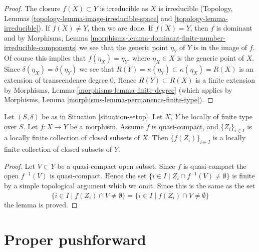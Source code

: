 \begin{proof}
The closure $\overline{f(X)} \subset Y$ is irreducible as $X$
is irreducible (Topology, Lemmas
\ref{topology-lemma-image-irreducible-space} and
\ref{topology-lemma-irreducible}).
If $\overline{f(X)} \not = Y$, then we are done.
If $\overline{f(X)} = Y$, then $f$ is dominant and by
Morphisms,
Lemma \ref{morphisms-lemma-dominant-finite-number-irreducible-components}
we see that the generic point $\eta_Y$ of $Y$ is in the image of $f$.
Of course this implies that $f(\eta_X) = \eta_Y$, where $\eta_X \in X$
is the generic point of $X$. Since $\delta(\eta_X) = \delta(\eta_Y)$
we see that $R(Y) = \kappa(\eta_Y) \subset \kappa(\eta_X) = R(X)$
is an extension of transcendence degree $0$.
Hence $R(Y) \subset R(X)$ is a finite extension by
Morphisms, Lemma \ref{morphisms-lemma-finite-degree}
(which applies by
Morphisms, Lemma \ref{morphisms-lemma-permanence-finite-type}).
\end{proof}

\begin{lemma}
\label{lemma-quasi-compact-locally-finite}
Let $(S, \delta)$ be as in Situation \ref{situation-setup}.
Let $X$, $Y$ be locally of finite type over $S$.
Let $f : X \to Y$ be a morphism.
Assume $f$ is quasi-compact, and $\{Z_i\}_{i \in I}$ is a locally
finite collection of closed subsets of $X$.
Then $\{\overline{f(Z_i)}\}_{i \in I}$ is a locally finite
collection of closed subsets of $Y$.
\end{lemma}

\begin{proof}
Let $V \subset Y$ be a quasi-compact open subset.
Since $f$ is quasi-compact the open $f^{-1}(V)$ is
quasi-compact. Hence the set
$\{i \in I \mid Z_i \cap f^{-1}(V) \not = \emptyset \}$
is finite by a simple topological argument which we omit.
Since this is the same as the set
$$
\{i \in I \mid f(Z_i) \cap V \not = \emptyset \} =
\{i \in I \mid \overline{f(Z_i)} \cap V \not = \emptyset \}
$$
the lemma is proved.
\end{proof}









\section{Proper pushforward}
\label{section-proper-pushforward}

